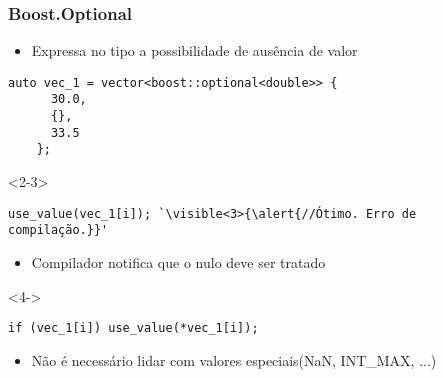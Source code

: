 \documentclass[t]{beamer}
\begin{document}
\begin{frame}[fragile]
  \frametitle{Boost.Optional}
  \begin{itemize}
    \item<1->{Expressa no tipo a possibilidade de ausência de valor}
  \end{itemize}
  \begin{lstlisting}[escapeinside=`']
    auto vec_1 = vector<boost::optional<double>> {
      30.0,
      {},
      33.5
    };
  \end{lstlisting}



  \begin{onlyenv}<2-3>
  \begin{lstlisting}[escapeinside=`']
    use_value(vec_1[i]); `\visible<3>{\alert{//Ótimo. Erro de compilação.}}'
  \end{lstlisting}
  \end{onlyenv}

  \begin{itemize}
    \item<3>{Compilador notifica que o nulo deve ser tratado}
  \end{itemize}

  \begin{onlyenv}<4->
  \begin{lstlisting}[escapeinside=`']
    if (vec_1[i]) use_value(*vec_1[i]);
  \end{lstlisting}
  \end{onlyenv}

  \begin{itemize}
    \item<5->{Não é necessário lidar com valores especiais(NaN, INT\_MAX, ...)}
  \end{itemize}
\end{frame}
\end{document}
